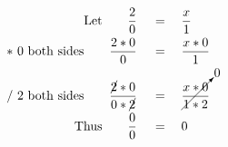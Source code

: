 \begin{align*}
\mathrm{Let}\qquad\frac{2}{0}\quad&\,=\quad\frac{x}{1}\\
\mathrm{*~0~both~sides}\qquad\frac{2*0}{0}\quad&\,=\quad\frac{x*0}{1}\\
\mathrm{/~2~both~sides}\qquad\frac{\cancel{2}*0}{0*\cancel{2}}\quad&\,=\quad\cancelto{0}{\frac{x*0}{1*2}}\\
\mathrm{Thus}\qquad\frac{0}{0}\quad&\,=\quad0
\end{align*}
